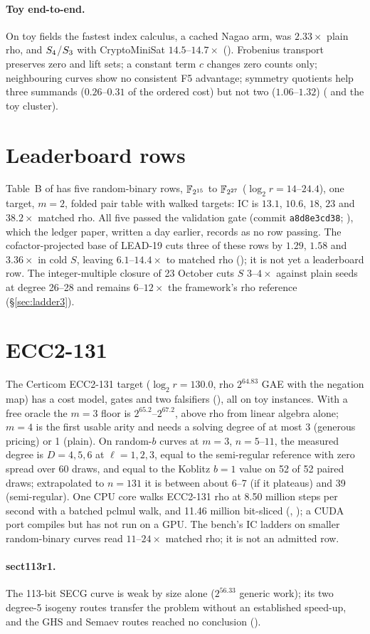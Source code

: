 \paragraph{Toy end-to-end.} On toy fields the fastest index calculus, a
cached Nagao arm, was $2.33\times$ plain rho, and $S_{4}$/$S_{3}$ with
CryptoMiniSat $14.5$--$14.7\times$ ().
Frobenius transport preserves zero and lift sets; a constant term $c$
changes zero counts only; neighbouring curves show no consistent F5
advantage; symmetry quotients help three summands ($0.26$--$0.31$ of the
ordered cost) but not two ($1.06$--$1.32$)
( and the toy cluster).

\section{Leaderboard rows}

Table~B of  has five random-binary rows,
$\mathbb{F}_{2^{15}}$ to $\mathbb{F}_{2^{27}}$ ($\log_2 r=14$--$24.4$), one target, $m=2$,
folded pair table with walked targets: IC is $13.1$, $10.6$, $18$, $23$ and
$38.2\times$ matched rho. All five passed the validation gate
(commit \texttt{a8d8e3cd38}; ),
which the ledger paper, written a day earlier, records as no row passing.
The cofactor-projected base of LEAD-19 cuts three of these rows by
$1.29$, $1.58$ and $3.36\times$ in cold $S$, leaving $6.1$--$14.4\times$ to
matched rho (); it is not yet a
leaderboard row. The integer-multiple closure of 23 October cuts $S$
$3$--$4\times$ against plain seeds at degree 26--28 and remains $6$--$12\times$
the framework's rho reference (\S\ref{sec:ladder3}).

\section{ECC2-131}

The Certicom ECC2-131 target ($\log_2 r=130.0$, rho $2^{64.83}$ GAE with the
negation map) has a cost model, gates and two falsifiers
(), all on toy instances. With a free
oracle the $m=3$ floor is $2^{65.2}$--$2^{67.2}$, above rho from linear
algebra alone; $m=4$ is the first usable arity and needs a solving degree of
at most 3 (generous pricing) or 1 (plain). On random-$b$ curves at $m=3$,
$n=5$--$11$, the measured degree is $D=4,5,6$ at $\ell=1,2,3$, equal to the
semi-regular reference with zero spread over 60 draws, and equal to the
Koblitz $b=1$ value on 52 of 52 paired draws; extrapolated to $n=131$ it is
between about 6--7 (if it plateaus) and 39 (semi-regular). One CPU core walks
ECC2-131 rho at 8.50 million steps per second with a batched pclmul walk, and
11.46 million bit-sliced (,
); a CUDA port compiles but
has not run on a GPU. The bench's IC ladders on smaller random-binary
curves read $11$--$24\times$ matched rho; it is not an admitted row.

\paragraph{sect113r1.} The 113-bit SECG curve is weak by size alone
($2^{56.33}$ generic work); its two degree-5 isogeny routes transfer the
problem without an established speed-up, and the GHS and Semaev routes
reached no conclusion ().
